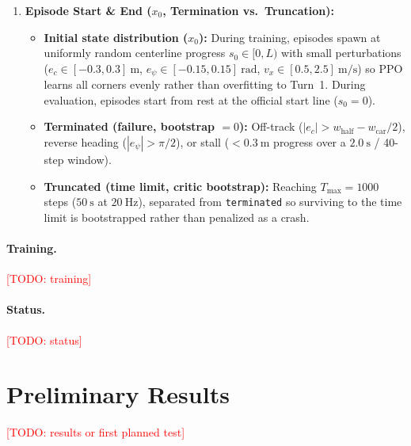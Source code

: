 \documentclass[12pt]{article}
\newcommand{\todo}[1]{\textcolor{red}{[TODO: #1]}}
\begin{document}
\begin{enumerate}[leftmargin=1.5em, itemsep=0.35em]
    \item \textbf{Episode Start \& End ($x_0$, Termination vs.\ Truncation):}
    \begin{itemize}[leftmargin=1.5em, itemsep=0.15em]
        \item \textbf{Initial state distribution ($x_0$):} During training, episodes spawn at uniformly random centerline progress $s_0 \in [0, L)$ with small perturbations ($e_c \in [-0.3, 0.3]~\text{m}$, $e_\psi \in [-0.15, 0.15]~\text{rad}$, $v_x \in [0.5, 2.5]~\text{m/s}$) so PPO learns all corners evenly rather than overfitting to Turn~1. During evaluation, episodes start from rest at the official start line ($s_0 = 0$).
        \item \textbf{Terminated (failure, bootstrap $= 0$):} Off-track ($|e_c| > w_{\text{half}} - w_{\text{car}}/2$), reverse heading ($|e_\psi| > \pi/2$), or stall ($< 0.3~\text{m}$ progress over a $2.0~\text{s}$ / 40-step window).
        \item \textbf{Truncated (time limit, critic bootstrap):} Reaching $T_{\max} = 1000$ steps ($50~\text{s}$ at $20~\text{Hz}$), separated from \texttt{terminated} so surviving to the time limit is bootstrapped rather than penalized as a crash.
    \end{itemize}
\end{enumerate}

\paragraph{Training.}
\todo{training}

\paragraph{Status.}
\todo{status}

\section{Preliminary Results}

\todo{results or first planned test}
\end{document}
